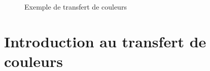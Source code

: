 \vspace{1.5cm}

\begin{figure}[h!]
  \centering
  \caption{Exemple de transfert de couleurs}
  \label{fig:exemple_transfert}
\end{figure}

\clearpage

\section*{Introduction au transfert de couleurs}
\label{sec:intro_transfert}


